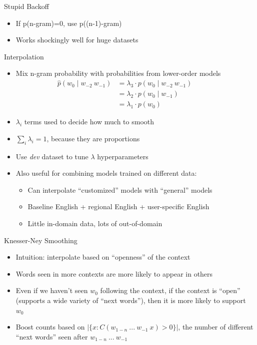 \documentclass[11pt,letterpaper]{article}
\begin{document}
Stupid Backoff

\begin{itemize}
  \item If p(n-gram)=0, use p((n-1)-gram)
  \item Works shockingly well for huge datasets
\end{itemize}


Interpolation

\begin{itemize}
  \item Mix n-gram probability with probabilities from lower-order models
    \begin{align*}
      \hat{p}(w_0 \mid w_{-2}~w_{-1}) &= \lambda_3 \cdot p(w_0 \mid w_{-2}~w_{-1}) &&&& \\
                                      &= \lambda_2 \cdot p(w_0 \mid w_{-1}) \\
                                      &= \lambda_1 \cdot p(w_0)
    \end{align*}
  \item $\lambda_i$ terms used to decide how much to smooth
  \item $\sum_i \lambda_i = 1$, because they are proportions
  \item Use \textit{dev} dataset to tune $\lambda$ hyperparameters
  \item Also useful for combining models trained on different data:
  \begin{itemize}
    \item Can interpolate ``customized'' models with ``general'' models
    \item Baseline English + regional English + user-specific English
    \item Little in-domain data, lots of out-of-domain
  \end{itemize}
\end{itemize}


Knesser-Ney Smoothing

\begin{itemize}
  \item Intuition: interpolate based on ``openness'' of the context
  \item Words seen in more contexts are more likely to appear in others
  \item Even if we haven't seen $w_0$ following the context, if the context is ``open'' (supports a wide variety of ``next words''), then it is more likely to support $w_0$
  \item Boost counts based on $|\{x : C(w_{1-n}~...~w_{-1}~x)>0\}|$, the number of different ``next words'' seen after $w_{1-n}~...~w_{-1}$
\end{itemize}
\end{document}
